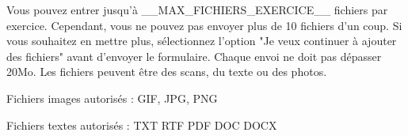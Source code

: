 ﻿Vous pouvez entrer jusqu'à __MAX_FICHIERS_EXERCICE__ fichiers par exercice.
Cependant, vous ne pouvez pas envoyer plus de 10 fichiers d'un coup. Si vous souhaitez en mettre plus, sélectionnez l'option "Je veux continuer à ajouter des fichiers" avant d'envoyer le formulaire.
Chaque envoi ne doit pas dépasser 20Mo.
Les fichiers peuvent être des scans, du texte ou des photos.
\item Fichiers images autorisés : GIF, JPG, PNG
\item Fichiers textes autorisés : TXT RTF PDF DOC DOCX